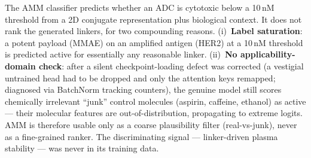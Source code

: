 \documentclass[10pt]{article}
\begin{document}
The AMM classifier\cite{mslati2026} predicts whether an ADC is cytotoxic below a 10\,nM threshold from a
2D conjugate representation plus biological context. It does not rank the generated linkers, for two
compounding reasons. (i)~\textbf{Label saturation}: a potent payload (MMAE) on an amplified antigen (HER2)
at a 10\,nM threshold is predicted active for essentially any reasonable linker. (ii)~\textbf{No
applicability-domain check}: after a silent checkpoint-loading defect was corrected (a vestigial untrained
head had to be dropped and only the attention keys remapped; diagnosed via BatchNorm tracking counters),
the genuine model still scores chemically irrelevant ``junk'' control molecules (aspirin, caffeine,
ethanol) as active --- their molecular features are out-of-distribution, propagating to extreme logits.
AMM is therefore usable only as a coarse plausibility filter (real-vs-junk), never as a fine-grained
ranker. The discriminating signal --- linker-driven plasma stability --- was never in its training data.

{\small


}
\end{document}
